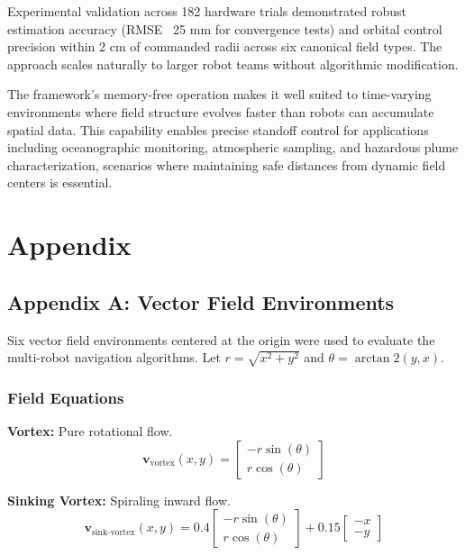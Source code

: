 \documentclass[lettersize,journal]{IEEEtran}
\begin{document}
Experimental validation across 182 hardware trials demonstrated robust estimation accuracy (RMSE ~25 mm for convergence tests) and orbital
control precision within 2 cm of commanded radii across six canonical field types. The approach scales naturally to larger robot teams
without algorithmic modification.

The framework's memory-free operation makes it well suited to
time-varying environments where field structure evolves faster than robots can accumulate spatial data. This capability enables precise
standoff control for applications including oceanographic monitoring,
atmospheric sampling, and hazardous plume characterization, scenarios where maintaining safe distances from dynamic field centers is essential.


\section{Appendix}

\subsection{Appendix A: Vector Field Environments}
\label{sec:appendix_vector_fields}

Six vector field environments centered at the origin were used to evaluate the multi-robot navigation algorithms. Let $r = \sqrt{x^2 + y^2}$ and $\theta = \arctan2(y, x)$.

\subsubsection{Field Equations}

\textbf{Vortex:} Pure rotational flow.
\begin{equation}
\mathbf{v}_{\text{vortex}}(x, y) = \begin{bmatrix} -r \sin(\theta) \\ r \cos(\theta) \end{bmatrix}
\end{equation}

\textbf{Sinking Vortex:} Spiraling inward flow.
\begin{equation}
\mathbf{v}_{\text{sink-vortex}}(x, y) = 0.4 \begin{bmatrix} -r \sin(\theta) \\ r \cos(\theta) \end{bmatrix} + 0.15 \begin{bmatrix} -x \\ -y \end{bmatrix}
\end{equation}
\end{document}
